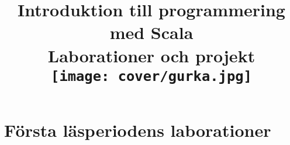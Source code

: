 \documentclass[a4paper]{compendium}
\title{
{\vspace{-3.0cm}\bf\sffamily\Huge\selectfont  Introduktion till programmering med Scala}
\\ \vspace{1em}%
{\sffamily  Laborationer och projekt}\\\vspace{2cm}
\texttt{[image: cover/gurka.jpg]}
}
\date{\raggedbottom%
\vspace{-2em}\begin{minipage}{1.0\textwidth}\centering
EDAA45, Lp1-2, HT \CurrentYear\\
Datavetenskap, LTH\\
Lunds Universitet\\
~\\
Kompileringsdatum: \today \\
\url{http://cs.lth.se/pgk}
\end{minipage}
}
\newcommand{\SlideHeading}[1]{} %
\begin{document}
\frontmatter
\maketitle

%
%

\setcounter{tocdepth}{2} %
\tableofcontents
\mainmatter


\renewcommand{\Lab}[1]{\newpage\chapter{Laboration: {\tt #1}}\label{section:lab:#1}}
\renewcommand{\Teamlab}[1]{\newpage\chapter{Grupplaboration: {\tt #1}}\label{section:lab:#1}}
\renewcommand{\subsection}{\section}


\part{Första läsperiodens laborationer}


%


%
%
\end{document}

